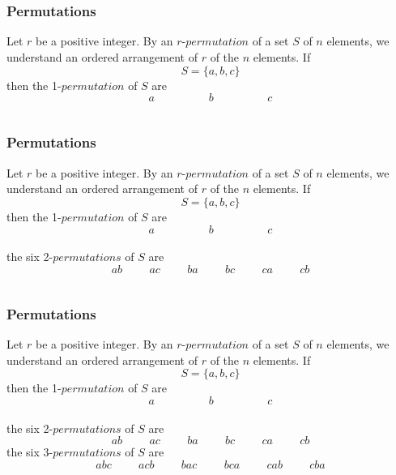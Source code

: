 \documentclass{beamer}
\begin{document}
\section{}
 \begin{frame}
\frametitle{Permutations}
Let  $r$ be a positive integer. By an $r$-$permutation$ of a set $S$ of $ n$ elements, we understand an ordered arrangement of $ r$ of the $n$ elements. If 
$$S =  \{   a ,     b   ,c  \} $$
 then the 1-$permutation$ of $S$ are
                  $$a \hspace{2cm}     b        \hspace{2cm} c$$
\end{frame}

\section{}
 \begin{frame}
\frametitle{Permutations}
Let  $r$ be a positive integer. By an $r$-$permutation$ of a set $S$ of $ n$ elements, we understand an ordered arrangement of $ r$ of the $n$ elements. If 
$$S =  \{   a ,     b   ,c  \} $$
 then the 1-$permutation$ of $S$ are
                  $$a \hspace{2cm}     b        \hspace{2cm} c$$
\\the six 2-$permutations$ of $S$ are   
$$ab \hspace{1cm} ac  \hspace{1cm} ba \hspace{1cm}                bc      \hspace{1cm}ca \hspace{1cm}         cb $$  
\end{frame}

\section{}
 \begin{frame}
\frametitle{Permutations}
Let  $r$ be a positive integer. By an $r$-$permutation$ of a set $S$ of $ n$ elements, we understand an ordered arrangement of $ r$ of the $n$ elements. If 
$$S =  \{   a ,     b   ,c  \} $$
 then the 1-$permutation$ of $S$ are
                  $$a \hspace{2cm}     b        \hspace{2cm} c$$
\\the six 2-$permutations$ of $S$ are   
$$ab \hspace{1cm} ac  \hspace{1cm} ba \hspace{1cm}                bc      \hspace{1cm}ca \hspace{1cm}         cb $$  
the six 3-$permutations$ of $S$ are
\\
                           $$abc    \hspace{1cm}acb \hspace{1cm}        bac \hspace{1cm} bca \hspace{1cm}        cab        \hspace{1cm} cba$$  
\end{frame}
\end{document}

